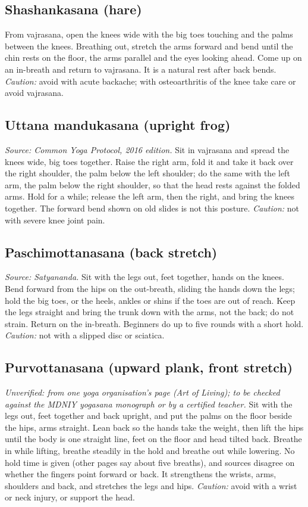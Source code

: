 \subsection*{Shashankasana (hare)}
From vajrasana, open the knees wide with the big toes touching and the palms between the knees. Breathing out, stretch the arms forward and bend until the chin rests on the floor, the arms parallel and the eyes looking ahead. Come up on an in-breath and return to vajrasana. It is a natural rest after back bends.
\textit{Caution:} avoid with acute backache; with osteoarthritis of the knee take care or avoid vajrasana.

\subsection*{Uttana mandukasana (upright frog)}
\textit{Source: Common Yoga Protocol, 2016 edition.} Sit in vajrasana and spread the knees wide, big toes together. Raise the right arm, fold it and take it back over the right shoulder, the palm below the left shoulder; do the same with the left arm, the palm below the right shoulder, so that the head rests against the folded arms. Hold for a while; release the left arm, then the right, and bring the knees together. The forward bend shown on old slides is not this posture.
\textit{Caution:} not with severe knee joint pain.

\subsection*{Paschimottanasana (back stretch)}
\textit{Source: Satyananda.} Sit with the legs out, feet together, hands on the knees. Bend forward from the hips on the out-breath, sliding the hands down the legs; hold the big toes, or the heels, ankles or shins if the toes are out of reach. Keep the legs straight and bring the trunk down with the arms, not the back; do not strain. Return on the in-breath. Beginners do up to five rounds with a short hold.
\textit{Caution:} not with a slipped disc or sciatica.

\subsection*{Purvottanasana (upward plank, front stretch)}
\textit{Unverified: from one yoga organisation's page (Art of Living); to be checked against the MDNIY yogasana monograph or by a certified teacher.} Sit with the legs out, feet together and back upright, and put the palms on the floor beside the hips, arms straight. Lean back so the hands take the weight, then lift the hips until the body is one straight line, feet on the floor and head tilted back. Breathe in while lifting, breathe steadily in the hold and breathe out while lowering. No hold time is given (other pages say about five breaths), and sources disagree on whether the fingers point forward or back. It strengthens the wrists, arms, shoulders and back, and stretches the legs and hips.
\textit{Caution:} avoid with a wrist or neck injury, or support the head.

